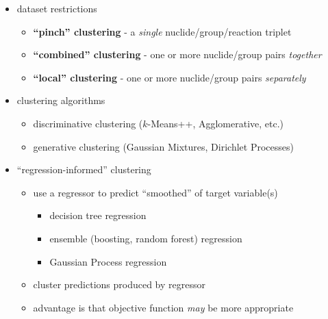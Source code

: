 \begin{itemize}[noitemsep]
  \item dataset restrictions
  \begin{itemize}[noitemsep]
    \item \textbf{``pinch'' clustering} - a \textit{single} nuclide/group/reaction triplet
    \item \textbf{``combined'' clustering} - one or more nuclide/group pairs \textit{together}
    \item \textbf{``local'' clustering} - one or more nuclide/group pairs \textit{separately}
  \end{itemize}
  \item clustering algorithms
  \begin{itemize}[noitemsep]
    \item discriminative clustering ($k$-Means++, Agglomerative, etc.)
    \item generative clustering (Gaussian Mixtures, Dirichlet Processes)
  \end{itemize}
  \item ``regression-informed'' clustering
  \begin{itemize}[noitemsep]
    \item use a regressor to predict ``smoothed'' of target variable(s)
    \begin{itemize}[noitemsep]
      \item decision tree regression
      \item ensemble (boosting, random forest) regression
      \item Gaussian Process regression
    \end{itemize}
    \item cluster predictions produced by regressor
    \item advantage is that objective function \textit{may} be more appropriate
  \end{itemize}
\end{itemize}